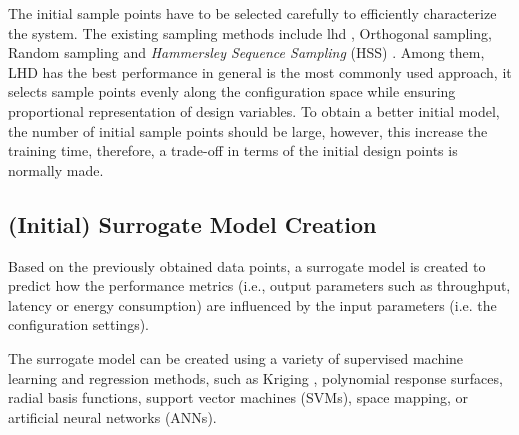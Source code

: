 The initial sample points have to be selected carefully to efficiently characterize the system. The existing sampling methods include \gls{lhd} \cite{viana2013}, Orthogonal sampling, Random sampling and  \textit{Hammersley Sequence Sampling} (HSS) \cite{wong1997sampling}. Among them, LHD has the best performance in general is the most commonly used approach, it selects sample points evenly along the configuration space while ensuring proportional representation of design variables. To obtain a better initial model, the number of initial sample points should be large, however, this increase the training time, therefore, a trade-off in terms of the initial design points is normally made. 

\subsection{(Initial) Surrogate Model Creation}

Based on the previously obtained data points, a surrogate model is created to predict how the performance metrics (i.e., output parameters such as throughput, latency or energy consumption) are influenced by the input parameters (i.e. the configuration settings). 

The surrogate model can be created using a variety of supervised machine learning and regression methods, such as Kriging \cite{forrester2008engineering}, polynomial response surfaces, radial basis functions, support vector machines (SVMs), space mapping, or artificial neural networks (ANNs). 


